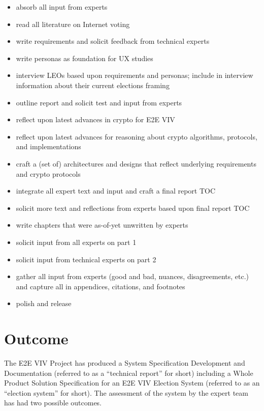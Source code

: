 \begin{itemize}
\item absorb all input from experts
\item read all literature on Internet voting
\item write requirements and solicit feedback from technical experts
\item write personas as foundation for UX studies
\item interview LEOs based upon requirements and personas; include in
  interview information about their current elections framing
\item outline report and solicit test and input from experts
\item reflect upon latest advances in crypto for E2E VIV
\item reflect upon latest advances for reasoning about crypto
  algorithms, protocols, and implementations
\item craft a (set of) architectures and designs that reflect
  underlying requirements and crypto protocols
\item integrate all expert text and input and craft a final report TOC
\item solicit more text and reflections from experts based upon final
  report TOC
\item write chapters that were as-of-yet unwritten by experts
\item solicit input from all experts on part 1
\item solicit input from technical experts on part 2
\item gather all input from experts (good and bad, nuances,
  disagreements, etc.) and capture all in appendices, citations, and
  footnotes
\item polish and release
\end{itemize}

\section{Outcome}
\label{sec:outcome}

The E2E VIV Project has produced a System Specification Development
and Documentation (referred to as a ``technical report'' for short)
including a Whole Product Solution Specification for an E2E VIV
Election System (referred to as an ``election system'' for short). The
assessment of the system by the expert team has had two possible
outcomes.

